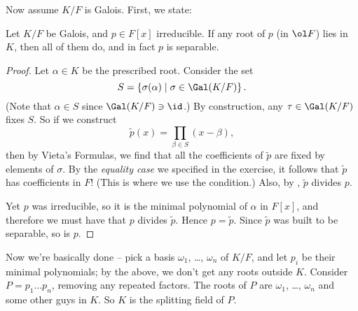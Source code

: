\bigskip

Now assume $K/F$ is Galois.
First, we state:
\begin{lemma}
	Let $K/F$ be Galois, and $p \in F[x]$ irreducible.
	If any root of $p$ (in $\ol F$) lies in $K$, then all of them do,
	and in fact $p$ is separable.
\end{lemma}
\begin{proof}
	Let $\alpha \in K$ be the prescribed root.
	Consider the set
	\[ S = \left\{ \sigma(\alpha) \mid \sigma \in \Gal(K/F) \right\}. \]
	(Note that $\alpha \in S$ since $\Gal(K/F) \ni \id$.)
	By construction, any $\tau \in \Gal(K/F)$ fixes $S$.
	So if we construct
	\[ \tilde p(x) = \prod_{\beta \in S} (x - \beta), \]
	then by Vieta's Formulas, we find that all the coefficients of $\tilde p$ are fixed by elements of $\sigma$.
	By the \emph{equality case} we specified in the exercise, it follows that $\tilde p$ has coefficients in $F$!
	(This is where we use the condition.)
	Also, by , $\tilde p$ divides $p$.

	Yet $p$ was irreducible, so it is the minimal polynomial of $\alpha$ in $F[x]$,
	and therefore we must have that $p$ divides $\tilde p$.
	Hence $p = \tilde p$. Since $\tilde p$ was built to be separable, so is $p$.
\end{proof}
Now we're basically done -- pick a basis $\omega_1$, \dots, $\omega_n$ of $K/F$,
and let $p_i$ be their minimal polynomials; by the above, we don't get any roots outside $K$.
Consider $P = p_1 \dots p_n$, removing any repeated factors.
The roots of $P$ are $\omega_1$, \dots, $\omega_n$ and some other guys in $K$.
So $K$ is the splitting field of $P$.
